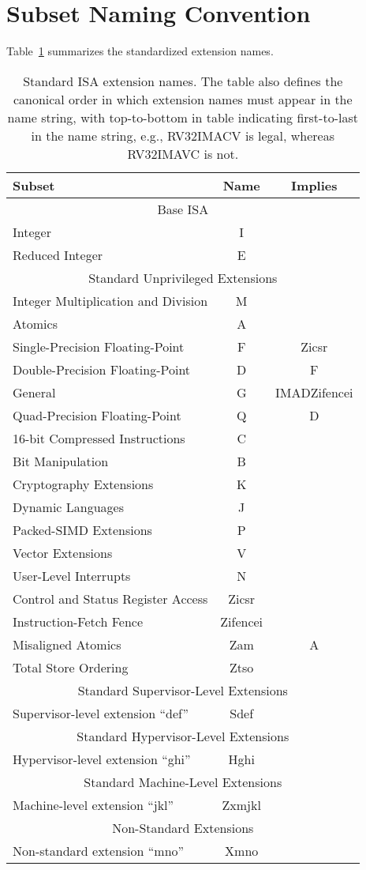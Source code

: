 \section{Subset Naming Convention}
Table~\ref{isanametable} summarizes the standardized extension names.
~\\
\begin{table}[h]
\center
\begin{tabular}{|l|c|c|}
\hline
Subset & Name & Implies \\
\hline
\hline
\multicolumn{3}{|c|}{Base ISA}\\
\hline
Integer & I & \\
Reduced Integer & E & \\
\hline
\hline
\multicolumn{3}{|c|}{Standard Unprivileged Extensions}\\
\hline
Integer Multiplication and Division & M & \\
Atomics & A & \\
Single-Precision Floating-Point & F & Zicsr \\
Double-Precision Floating-Point & D & F \\
\hline
General & G & IMADZifencei \\
\hline
Quad-Precision Floating-Point & Q & D\\
16-bit Compressed Instructions & C & \\
Bit Manipulation & B & \\
Cryptography Extensions & K & \\
Dynamic Languages & J & \\
Packed-SIMD Extensions & P & \\
Vector Extensions & V & \\
User-Level Interrupts & N & \\
Control and Status Register Access & Zicsr & \\
Instruction-Fetch Fence & Zifencei & \\
Misaligned Atomics & Zam & A \\
Total Store Ordering & Ztso & \\
\hline
\hline
\multicolumn{3}{|c|}{Standard Supervisor-Level Extensions}\\
\hline
Supervisor-level extension ``def'' & Sdef & \\
\hline
\hline
\multicolumn{3}{|c|}{Standard Hypervisor-Level Extensions}\\
\hline
Hypervisor-level extension ``ghi'' & Hghi & \\
\hline
\hline
\multicolumn{3}{|c|}{Standard Machine-Level Extensions}\\
\hline
Machine-level extension ``jkl'' & Zxmjkl & \\
\hline
\hline
\multicolumn{3}{|c|}{Non-Standard Extensions}\\
\hline
Non-standard extension ``mno'' & Xmno & \\
\hline
\end{tabular}
\caption{Standard ISA extension names.  The table also defines the
  canonical order in which extension names must appear in the name
  string, with top-to-bottom in table indicating first-to-last in the
  name string, e.g., RV32IMACV is legal, whereas RV32IMAVC is not.}
\label{isanametable}
\end{table}


